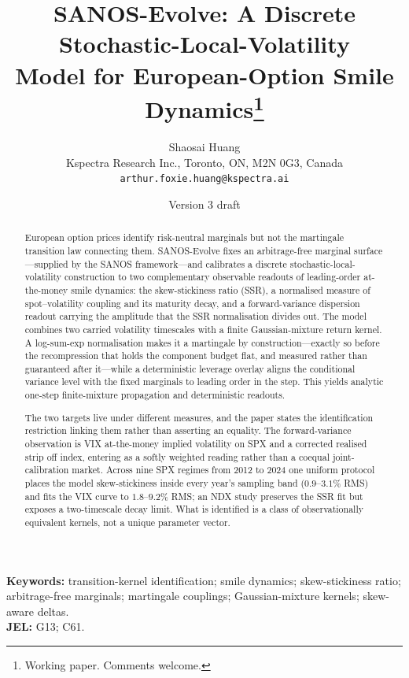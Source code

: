 \documentclass[11pt]{article}
\title{SANOS-Evolve: A Discrete Stochastic-Local-Volatility\\
Model for European-Option Smile Dynamics\thanks{Working paper. Comments welcome.}}
\author{Shaosai Huang\\
  \small Kspectra Research Inc., Toronto, ON, M2N 0G3, Canada\\
  \small \texttt{arthur.foxie.huang@kspectra.ai}}
\date{Version 3 draft}
\providecommand{\1}{\mathbf 1}
\begin{document}
\maketitle

\begin{abstract}
European option prices identify risk-neutral marginals but not the martingale
transition law connecting them. SANOS-Evolve fixes an arbitrage-free marginal
surface---supplied by the SANOS framework---and calibrates a discrete
stochastic-local-volatility construction to two complementary observable readouts of
leading-order at-the-money smile dynamics: the skew-stickiness ratio (SSR), a
normalised measure of spot--volatility coupling and its maturity decay, and a
forward-variance dispersion readout carrying the amplitude that the SSR
normalisation divides out. The model combines two carried volatility timescales
with a finite Gaussian-mixture return kernel. A log-sum-exp normalisation makes
it a martingale by construction---exactly so before the recompression that holds
the component budget flat, and measured rather than guaranteed after it---while a
deterministic leverage overlay aligns the conditional variance level with the
fixed marginals to leading order in the step. This yields analytic one-step
finite-mixture propagation and deterministic readouts.

The two targets live under different measures, and the paper states the
identification restriction linking them rather than asserting an equality. The
forward-variance observation is VIX at-the-money implied volatility on SPX and a
corrected realised strip off index, entering as a softly weighted reading rather
than a coequal joint-calibration market. Across nine SPX regimes from 2012 to
2024 one uniform protocol places the model skew-stickiness inside every year's
sampling band ($0.9$--$3.1\%$ RMS) and fits the VIX curve to $1.8$--$9.2\%$ RMS;
an NDX study preserves the SSR fit but exposes a two-timescale decay limit. What
is identified is a class of observationally equivalent kernels, not a unique
parameter vector.
\end{abstract}

\noindent
\textbf{Keywords:} transition-kernel identification; smile dynamics;
skew-stickiness ratio; arbitrage-free marginals; martingale couplings;
Gaussian-mixture kernels; skew-aware deltas.\\
\textbf{JEL:} G13; C61.

{\setcounter{tocdepth}{1}\small
\makeatletter\renewcommand*\l@section{\@dottedtocline{1}{0pt}{1.8em}}\makeatother
\tableofcontents}
\end{document}
